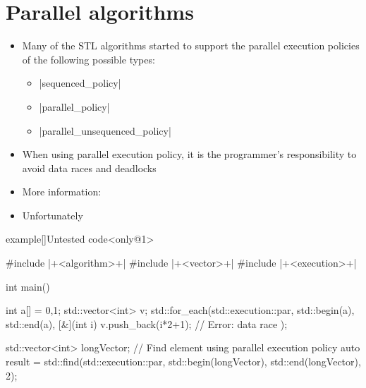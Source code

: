 \section{Parallel algorithms}
\begin{frame}[fragile]{\insertsectionhead}
    \vspace{-3mm}
    \begin{itemize}
        \item Many of the STL algorithms started to support the parallel execution policies of the following possible types:
              \begin{itemize}
                  \item \CPP|sequenced_policy|
                  \item \CPP|parallel_policy|
                  \item \CPP|parallel_unsequenced_policy|
              \end{itemize}
        \item \alert{When using parallel execution policy, it is the programmer's responsibility to avoid data races and deadlocks}
        \item More information: 
        \item Unfortunately  
    \end{itemize}
\end{frame}
\begin{frame}[fragile]{}
    \begin{varblock}{example}[\textwidth]{Untested code}<only@1>
        \begin{Cpp}
            #include |+<algorithm>+|
            #include |+<vector>+|
            #include |+<execution>+|

            int main()
            {
                int a[] = {0,1};
                std::vector<int> v;
                std::for_each(std::execution::par,
                              std::begin(a), std::end(a),
                              [&](int i){
                                  v.push_back(i*2+1); // Error: data race
                              });

                std::vector<int> longVector;
                // Find element using parallel execution policy
                auto result = std::find(std::execution::par,
                                        std::begin(longVector),
                                        std::end(longVector),
                                        2);
            }
        \end{Cpp}
    \end{varblock}
\end{frame}


